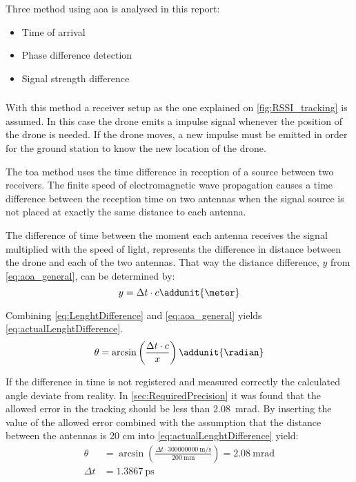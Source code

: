 \newpage
Three method using \gls{aoa} is analysed in this report:
\begin{itemize}
	\item Time of arrival 
	\item Phase difference detection 
	\item Signal strength difference
\end{itemize}

\subsubsection{} \label{TimeOfArrival}
With this method a receiver setup as the one explained on \autoref{fig:RSSI_tracking} is assumed. In this case the drone emits a impulse signal whenever the position of the drone is needed. If the drone moves, a new impulse must be emitted in order for the ground station to know the new location of the drone.

The \gls{toa} method uses the time difference in reception of a source between two receivers. The finite speed of electromagnetic wave propagation causes a time difference between the reception time on two antennas when the signal source is not placed at exactly the same distance to each antenna.

The difference of time between the moment each antenna receives the signal multiplied with the speed of light, represents the difference in distance between the drone and each of the two antennas. That way the distance difference, $y$ from \autoref{eq:aoa_general}, can be determined by: 
\begin{equation} \label{eq:LenghtDifference}
		y = \Delta t \cdot c \addunit{\meter} 
\end{equation}
\startexplain
{}
\stopexplain

Combining \autoref{eq:LenghtDifference} and \autoref{eq:aoa_general} yields \autoref{eq:actualLenghtDifference}. 
\begin{equation} \label{eq:actualLenghtDifference}
	 \theta = \arcsin \left( \frac{ \Delta t \cdot c}{x} \right) \addunit{\radian}
\end{equation}

If the difference in time is not registered and measured correctly the calculated angle deviate from reality. In \autoref{sec:RequiredPrecision} it was found that the allowed error in the tracking should be less than \SI{2,08}{\milli\radian}. By inserting the value of the allowed error combined with the assumption that the distance between the antennas is 20 cm into \autoref{eq:actualLenghtDifference} yield: 
\begin{subequations}
\begin{align}
\theta &= \arcsin \left( \frac{\Delta t \cdot \SI{300 000 000}{\meter\per\second} }{\SI{200}{\milli\meter}} \right) =  \SI{2,08}{\milli\radian} \label{eq:TOA:eq3} \\
\Delta t &= \SI{1,3867}{\pico\second} \label{eq:TOA:eq4}
\end{align}
\end{subequations} 

